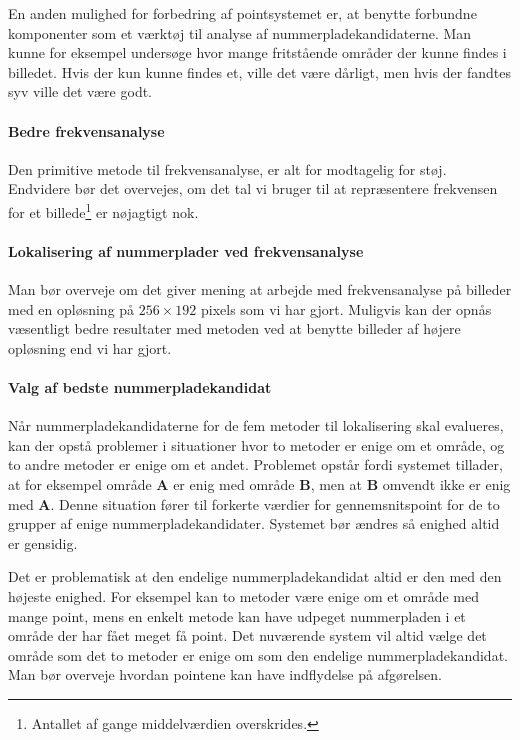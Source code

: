 En anden mulighed for forbedring af pointsystemet er, at benytte forbundne komponenter som et værktøj til analyse af nummerpladekandidaterne. Man kunne for eksempel undersøge hvor mange fritstående områder der kunne findes i billedet. Hvis der kun kunne findes et, ville det være dårligt, men hvis der fandtes syv ville det være godt. 

\paragraph{Bedre frekvensanalyse}
Den primitive metode til frekvensanalyse, er alt for modtagelig for støj. Endvidere bør det overvejes, om det tal vi bruger til at repræsentere frekvensen for et billede\footnote{Antallet af gange middelværdien overskrides.} er nøjagtigt nok.

\paragraph{Lokalisering af nummerplader ved frekvensanalyse}
Man bør overveje om det giver mening at arbejde med frekvensanalyse på billeder med en opløsning på $256 \times 192$ pixels som vi har gjort. Muligvis kan der opnås væsentligt bedre resultater med metoden ved at benytte billeder af højere opløsning end vi har gjort.

\paragraph{Valg af bedste nummerpladekandidat}
Når nummerpladekandidaterne for de fem metoder til lokalisering skal evalueres, kan der opstå  problemer i situationer hvor to metoder er enige om et område, og to andre metoder er enige om et andet. Problemet opstår fordi systemet tillader, at for eksempel område \textbf{A} er enig med område \textbf{B}, men at \textbf{B} omvendt ikke er enig med \textbf{A}. Denne situation fører til forkerte værdier for gennemsnitspoint for de to grupper af enige nummerpladekandidater. Systemet bør ændres så enighed altid er gensidig.

Det er problematisk at den endelige nummerpladekandidat altid er den med den højeste enighed. For eksempel kan to metoder være enige om et område med mange point, mens en enkelt metode kan have udpeget nummerpladen i et område der har fået meget få point. Det nuværende system vil altid vælge det område som det to metoder er enige om som den endelige nummerpladekandidat. Man bør overveje hvordan pointene kan have indflydelse på afgørelsen.

